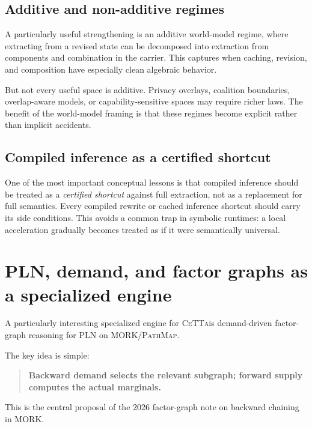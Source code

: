 \documentclass[11pt]{article}
\newcommand{\CeTTa}{\textsc{CeTTa}}
\newcommand{\PathMap}{\textsc{PathMap}}
\newcommand{\MORK}{\textsc{MORK}}
\begin{document}
\subsection{Additive and non-additive regimes}
A particularly useful strengthening is an additive world-model regime, where extracting from a revised state can be decomposed into extraction from components and combination in the carrier. This captures when caching, revision, and composition have especially clean algebraic behavior.

But not every useful space is additive. Privacy overlays, coalition boundaries, overlap-aware models, or capability-sensitive spaces may require richer laws. The benefit of the world-model framing is that these regimes become explicit rather than implicit accidents.

\subsection{Compiled inference as a certified shortcut}
One of the most important conceptual lessons is that compiled inference should be treated as a \emph{certified shortcut} against full extraction, not as a replacement for full semantics. Every compiled rewrite or cached inference shortcut should carry its side conditions. This avoids a common trap in symbolic runtimes: a local acceleration gradually becomes treated as if it were semantically universal.

\section{PLN, demand, and factor graphs as a specialized engine}
A particularly interesting specialized engine for \CeTTa is demand-driven factor-graph reasoning for PLN on \MORK/\PathMap.

The key idea is simple:
\begin{quote}
\textbf{Backward demand selects the relevant subgraph; forward supply computes the actual marginals.}
\end{quote}

This is the central proposal of the 2026 factor-graph note on backward chaining in \MORK \cite{goertzel2026factor}.
\end{document}
